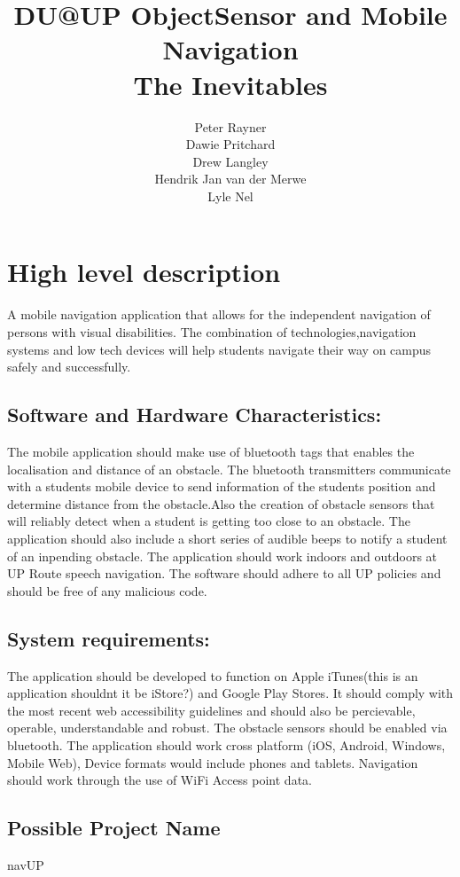 \documentclass{article}
\title{DU@UP ObjectSensor and Mobile Navigation \\
The Inevitables
}
\author{  
            Peter Rayner\\
            Dawie Pritchard\\
            Drew Langley\\
            Hendrik Jan van der Merwe\\
            Lyle Nel\\
        }
\begin{document}
\maketitle

\newpage

\tableofcontents

\newpage


\section{High level description}
A mobile navigation application that allows for the independent navigation of persons with visual disabilities. The combination of technologies,navigation systems and low tech devices will help students navigate their way on campus safely and successfully. 

\subsection{Software and Hardware Characteristics:}
The mobile application should make use of bluetooth tags that enables the localisation and distance of an obstacle. The bluetooth transmitters communicate with a students mobile device to send information of the students position and determine distance from the obstacle.Also the creation of obstacle sensors that will reliably detect when a student is getting too close to an obstacle. The application should also include a short series of audible beeps to notify a student of an inpending obstacle. The application should work indoors and outdoors at UP Route speech navigation. The software should adhere to all UP policies and should be free of any malicious code.

\subsection{System requirements:}
The application should be developed to function on Apple iTunes(this is an application shouldnt it be iStore?) and Google Play Stores.
It should  comply with the most recent web accessibility guidelines and should also be percievable, operable, understandable and robust.
The obstacle sensors should be enabled via bluetooth.
The application should work cross platform (iOS, Android, Windows, Mobile Web), Device formats would include phones and tablets. Navigation should work through the use of WiFi Access point data.

\subsection{Possible Project Name}
navUP
\end{document}
